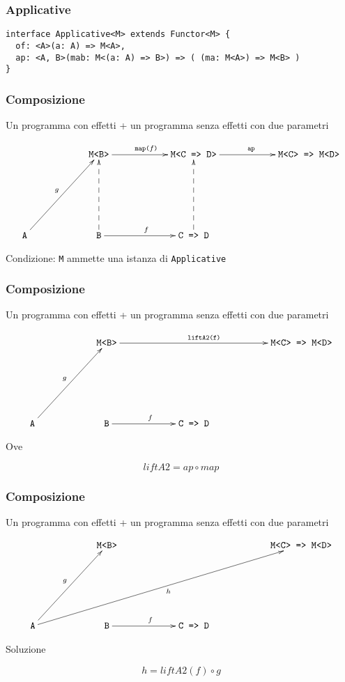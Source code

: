 \documentclass{beamer}
\begin{document}
\begin{frame}[fragile]
\frametitle{Applicative}

\begin{verbatim}
interface Applicative<M> extends Functor<M> {
  of: <A>(a: A) => M<A>,
  ap: <A, B>(mab: M<(a: A) => B>) => ( (ma: M<A>) => M<B> )
}
\end{verbatim}

\end{frame}

\begin{frame}
\frametitle{Composizione}

Un programma con effetti + un programma senza effetti con due parametri

\[
\xymatrixrowsep{2.5cm}
\xymatrixcolsep{2cm}
\xymatrix{
  & \texttt{M<B>} \ar[r]^{\texttt{map(}f\texttt{)}} & \texttt{M<C => D>} \ar[r]^{\texttt{ap}} & \texttt{M<C> => M<D>} \\
  \texttt{A} \ar[ur]^{g} & \texttt{B} \ar[r]^{f} \ar@{-->}[u]  & \texttt{C => D} \ar@{-->}[u]
}
\]

Condizione: \texttt{M} ammette una istanza di \texttt{Applicative}

\end{frame}

\begin{frame}
\frametitle{Composizione}

Un programma con effetti + un programma senza effetti con due parametri

\[
\xymatrixrowsep{2.5cm}
\xymatrixcolsep{2cm}
\xymatrix{
  & \texttt{M<B>} \ar[rr]^{\texttt{liftA2(f)}} & & \texttt{M<C> => M<D>} \\
  \texttt{A} \ar[ur]^{g} & \texttt{B} \ar[r]^{f} & \texttt{C => D}
}
\]

Ove

$$
liftA2 = ap \circ map
$$

\end{frame}

\begin{frame}
\frametitle{Composizione}

Un programma con effetti + un programma senza effetti con due parametri

\[
\xymatrixrowsep{2.5cm}
\xymatrixcolsep{2cm}
\xymatrix{
  & \texttt{M<B>} & &  \texttt{M<C> => M<D>} \\
  \texttt{A} \ar[ur]^{g} \ar[urrr]_{h} & \texttt{B} \ar[r]^{f} & \texttt{C => D}
}
\]

Soluzione

$$
h = liftA2(f) \circ g
$$

\end{frame}
\end{document}
